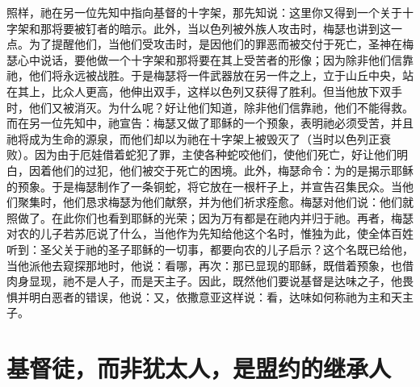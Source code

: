 照样，祂在另一位先知中指向基督的十字架，那先知说：这里你又得到一个关于十字架和那将要被钉者的暗示。此外，当以色列被外族人攻击时，梅瑟也讲到这一点。为了提醒他们，当他们受攻击时，是因他们的罪恶而被交付于死亡，圣神在梅瑟心中说话，要他做一个十字架和那将要在其上受苦者的形像；因为除非他们信靠祂，他们将永远被战胜。于是梅瑟将一件武器放在另一件之上，立于山丘中央，站在其上，比众人更高，他伸出双手，这样以色列又获得了胜利。但当他放下双手时，他们又被消灭。为什么呢？好让他们知道，除非他们信靠祂，他们不能得救。而在另一位先知中，祂宣告：梅瑟又做了耶稣的一个预象，表明祂必须受苦，并且祂将成为生命的源泉，而他们却以为祂在十字架上被毁灭了（当时以色列正衰败）。因为由于厄娃借着蛇犯了罪，主使各种蛇咬他们，使他们死亡，好让他们明白，因着他们的过犯，他们被交于死亡的困境。此外，梅瑟命令：为的是揭示耶稣的预象。于是梅瑟制作了一条铜蛇，将它放在一根杆子上，并宣告召集民众。当他们聚集时，他们恳求梅瑟为他们献祭，并为他们祈求痊愈。梅瑟对他们说：他们就照做了。在此你们也看到耶稣的光荣；因为万有都是在祂内并归于祂。再者，梅瑟对农的儿子若苏厄说了什么，当他作为先知给他这个名时，惟独为此，使全体百姓听到：圣父关于祂的圣子耶稣的一切事，都要向农的儿子启示？这个名既已给他，当他派他去窥探那地时，他说：看哪，再次：那已显现的耶稣，既借着预象，也借肉身显现，祂不是人子，而是天主子。因此，既然他们要说基督是达味之子，他畏惧并明白恶者的错误，他说：又，依撒意亚这样说：看，达味如何称祂为主和天主子。\par


\section{基督徒，而非犹太人，是盟约的继承人}

